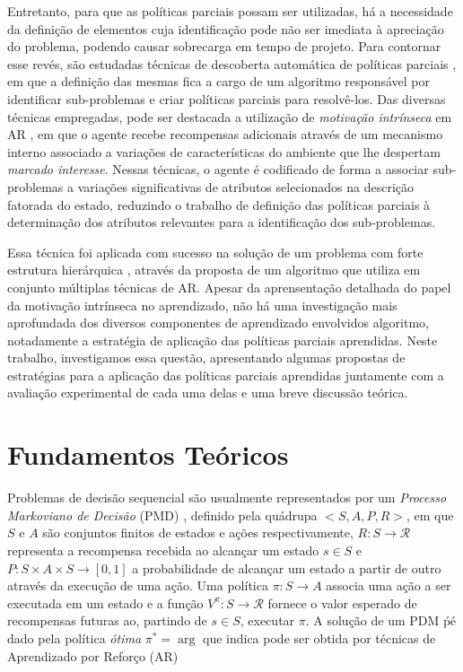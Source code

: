 \documentclass[kdmile,a4paper]{kdmile} %
\begin{document}
Entretanto, para que as políticas parciais possam ser utilizadas, há
a necessidade da definição de elementos cuja identificação pode não
ser imediata à apreciação do problema, podendo causar sobrecarga em
tempo de projeto. Para contornar esse revés, são estudadas técnicas
de descoberta automática de políticas parciais
\cite{stolle2002learning,bakker2004hierarchical,mcgovern2001automatic,imrl2004},
em que a definição das mesmas fica a cargo de um algoritmo
responsável por identificar sub-problemas e criar políticas parciais
para resolvê-los. Das diversas técnicas empregadas, pode ser
destacada a utilização de \emph{motivação intrínseca} em AR
\cite{imrl2004}, em que o agente recebe recompensas adicionais
através de um mecanismo interno associado a variações de
características do ambiente que lhe despertam \emph{marcado
interesse}. Nessas técnicas, o agente é codificado de forma a
associar sub-problemas a variações significativas de atributos
selecionados na descrição fatorada do estado, reduzindo o trabalho
de definição das políticas parciais à determinação dos atributos
relevantes para a identificação dos sub-problemas.

Essa técnica foi aplicada com sucesso na solução de um problema com
forte estrutura hierárquica \cite{imrl2004}, através da proposta de
um algoritmo que utiliza em conjunto múltiplas técnicas de
AR. Apesar da aprensentação detalhada do papel da motivação
intrínseca no aprendizado, não há uma investigação mais aprofundada
dos diversos componentes de aprendizado envolvidos algoritmo,
notadamente a estratégia de aplicação das políticas parciais
aprendidas. Neste trabalho, investigamos essa questão, apresentando
algumas propostas de estratégias para a aplicação das políticas
parciais aprendidas juntamente com a avaliação experimental de cada
uma delas e uma breve discussão teórica.

\section{Fundamentos Teóricos}
Problemas de decisão sequencial são usualmente representados por um
\emph{Processo Markoviano de Decisão} (PMD) \cite{puterman2009markov},
definido pela quádrupa $<S, A, P, R>$, em que $S$ e $A$ são conjuntos
finitos de estados e ações respectivamente,
$R:S\rightarrow\mathcal{R}$ representa a recompensa recebida ao
alcançar um estado $s \in S$ e $P:S\times A\times S \rightarrow [0,1]$
a probabilidade de alcançar um estado a partir de outro através da
execução de uma ação.  Uma política $\pi: S \rightarrow A$ associa uma
ação a ser executada em um estado e a função $V^{\pi}: S \rightarrow
\mathcal{R}$ fornece o valor esperado de recompensas futuras ao,
partindo de $s \in S$, executar $\pi$.  A solução de um PDM ṕé dado
pela política \emph{ótima} $\pi^* = \arg$
que indica pode ser obtida por técnicas de Aprendizado por Reforço
(AR) \cite{rlczaba}
\end{document}
